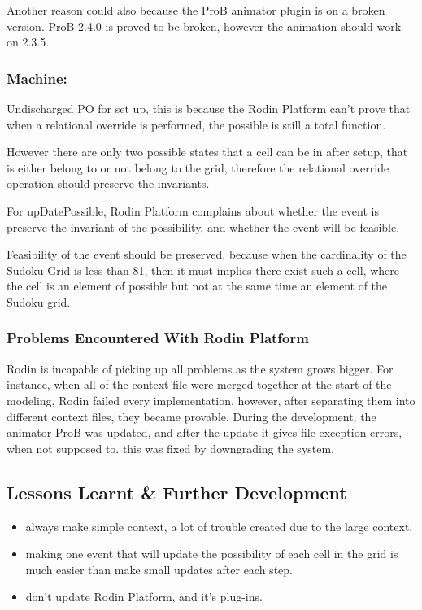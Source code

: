 \documentclass[a4paper]{article}
\begin{document}
Another reason could also because the ProB animator plugin is on a broken version. ProB 2.4.0 is proved to be broken, however the animation should work on 2.3.5.
\subsubsection{Machine:}
\indent\indent Undischarged PO for set up, this is because the Rodin Platform can't prove that when a relational override is performed, the possible is still a total function.

However there are only two possible states that a cell can be in after setup, that is either belong to or not belong to the grid, therefore the relational override operation should preserve the invariants.

For upDatePossible, Rodin Platform complains about whether the event is preserve the invariant of the possibility, and whether the event will be feasible.

Feasibility of the event should be preserved, because when the cardinality of the Sudoku Grid is less than 81, then it must implies there exist such a cell, where the cell is an element of possible but not at the same time an element of the Sudoku grid.

\subsubsection{Problems Encountered With Rodin Platform}
Rodin is incapable of picking up all problems as the system grows bigger.
For instance, when all of the context file were merged together at the start of the modeling, Rodin failed every implementation, however, after separating them into different context files, they became provable.
During the development, the animator ProB was updated, and after the update it gives file exception errors, when not supposed to. this was fixed by downgrading the system.

\newpage
\subsection{Lessons Learnt \& Further Development}
\begin{itemize}
\item always make simple context, a lot of trouble created due to the large context.
\item making one event that will update the possibility of each cell in the grid is much easier than make small updates after each step.
\item don't update Rodin Platform, and it's plug-ins.
\end{itemize}
\end{document}
